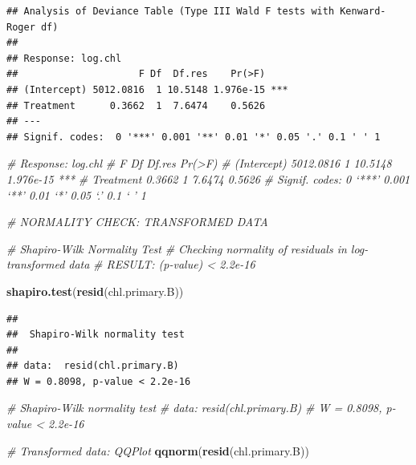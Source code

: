 \documentclass[
]{article}
\newenvironment{Shaded}{\begin{snugshade}}{\end{snugshade}}
\newcommand{\CommentTok}[1]{\textcolor[rgb]{0.56,0.35,0.01}{\textit{#1}}}
\newcommand{\FunctionTok}[1]{\textcolor[rgb]{0.13,0.29,0.53}{\textbf{#1}}}
\newcommand{\NormalTok}[1]{#1}
\begin{document}
\begin{verbatim}
## Analysis of Deviance Table (Type III Wald F tests with Kenward-Roger df)
## 
## Response: log.chl
##                     F Df  Df.res    Pr(>F)    
## (Intercept) 5012.0816  1 10.5148 1.976e-15 ***
## Treatment      0.3662  1  7.6474    0.5626    
## ---
## Signif. codes:  0 '***' 0.001 '**' 0.01 '*' 0.05 '.' 0.1 ' ' 1
\end{verbatim}

\begin{Shaded}
\begin{Highlighting}[]
\CommentTok{\# Response: log.chl}
                   \CommentTok{\# F Df  Df.res    Pr(\textgreater{}F)    }
\CommentTok{\# (Intercept) 5012.0816  1 10.5148 1.976e{-}15 ***}
\CommentTok{\# Treatment      0.3662  1  7.6474    0.5626    }
\CommentTok{\# Signif. codes:  0 ‘***’ 0.001 ‘**’ 0.01 ‘*’ 0.05 ‘.’ 0.1 ‘ ’ 1}
\end{Highlighting}
\end{Shaded}

\begin{Shaded}
\begin{Highlighting}[]
\CommentTok{\# NORMALITY CHECK: TRANSFORMED DATA  }

\CommentTok{\# Shapiro{-}Wilk Normality Test  }
\CommentTok{\# Checking normality of residuals in log{-}transformed data}
\CommentTok{\# RESULT: (p{-}value) \textless{} 2.2e{-}16}

\FunctionTok{shapiro.test}\NormalTok{(}\FunctionTok{resid}\NormalTok{(chl.primary.B))}
\end{Highlighting}
\end{Shaded}

\begin{verbatim}
## 
##  Shapiro-Wilk normality test
## 
## data:  resid(chl.primary.B)
## W = 0.8098, p-value < 2.2e-16
\end{verbatim}

\begin{Shaded}
\begin{Highlighting}[]
\CommentTok{\# Shapiro{-}Wilk normality test}
\CommentTok{\# data:  resid(chl.primary.B)}
\CommentTok{\# W = 0.8098, p{-}value \textless{} 2.2e{-}16}
\end{Highlighting}
\end{Shaded}

\begin{Shaded}
\begin{Highlighting}[]
\CommentTok{\# Transformed data: QQPlot }
\FunctionTok{qqnorm}\NormalTok{(}\FunctionTok{resid}\NormalTok{(chl.primary.B))}
\end{Highlighting}
\end{Shaded}
\end{document}
